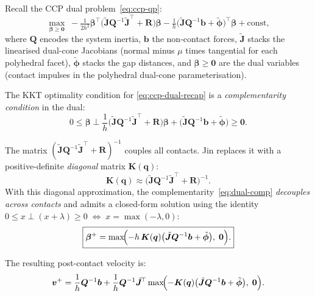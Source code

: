 \documentclass[11pt,twoside]{report}
\theoremstyle{definition}
\theoremstyle{plain}
\theoremstyle{remark}
\newcommand{\q}{\bm{q}}
\newcommand{\0}{\bm{0}}
\newcommand{\J}{\bm{J}}
\begin{document}
Recall the CCP dual problem~\eqref{eq:ccp-qp}:
\begin{equation}\label{eq:ccp-dual-recap}
\max_{\bm{\beta}\ge\0}\;-\tfrac{1}{2h^{2}}\bm{\beta}^{\!\top}
\bigl(\tilde{\J}\bm{Q}^{-1}\tilde{\J}^{\!\top}+\bm{R}\bigr)\bm{\beta}
-\tfrac{1}{h}\bigl(\tilde{\J}\bm{Q}^{-1}\bm{b}+\tilde{\bm{\phi}}\bigr)^{\!\top}\bm{\beta}
+\text{const},
\end{equation}
where $\bm{Q}$ encodes the system inertia, $\bm{b}$ the non-contact forces,
$\tilde{\J}$ stacks the linearised dual-cone Jacobians (normal minus $\mu$ times
tangential for each polyhedral facet), $\tilde{\bm{\phi}}$ stacks the gap distances,
and $\bm{\beta}\ge\0$ are the dual variables (contact impulses in the polyhedral
dual-cone parameterisation).

The KKT optimality condition for \eqref{eq:ccp-dual-recap} is a
\emph{complementarity condition} in the dual:
\begin{equation}\label{eq:dual-comp}
0\le\bm{\beta}\perp
\frac{1}{h}\bigl(\tilde{\J}\bm{Q}^{-1}\tilde{\J}^{\!\top}+\bm{R}\bigr)\bm{\beta}
+\bigl(\tilde{\J}\bm{Q}^{-1}\bm{b}+\tilde{\bm{\phi}}\bigr)\ge\0.
\end{equation}

\begin{stepbox}
The matrix $(\tilde{\J}\bm{Q}^{-1}\tilde{\J}^{\!\top}+\bm{R})^{-1}$
couples all contacts.  Jin replaces it with a positive-definite
\emph{diagonal} matrix $\bm{K}(\q)$:
\begin{equation}\label{eq:K-replacement}
\bm{K}(\q)\approx\bigl(\tilde{\J}\bm{Q}^{-1}\tilde{\J}^{\!\top}+\bm{R}\bigr)^{-1}.
\end{equation}
With this diagonal approximation, the complementarity~\eqref{eq:dual-comp}
\emph{decouples across contacts} and admits a closed-form solution
using the identity $0\le x\perp(x+\lambda)\ge 0\;\Leftrightarrow\;x=\max(-\lambda,0)$:
\begin{equation}\label{eq:beta-closed}
\boxed{
\bm{\beta}^{+}=\max\!\Bigl(-h\,\bm{K}(\q)\bigl(\tilde{\J}\bm{Q}^{-1}\bm{b}+\tilde{\bm{\phi}}\bigr),\;\0\Bigr).
}
\end{equation}
\end{stepbox}

The resulting post-contact velocity is:
\begin{equation}\label{eq:comfree-velocity}
\bm{v}^{+}=\frac{1}{h}\bm{Q}^{-1}\bm{b}
+\frac{1}{h}\bm{Q}^{-1}\tilde{\J}^{\!\top}
\max\!\Bigl(-\bm{K}(\q)\bigl(\tilde{\J}\bm{Q}^{-1}\bm{b}+\tilde{\bm{\phi}}\bigr),\;\0\Bigr).
\end{equation}
\end{document}
